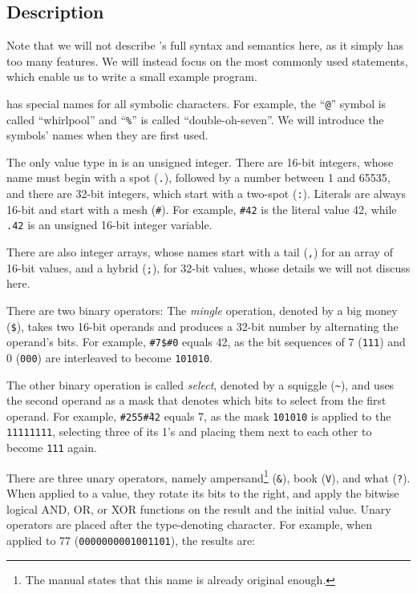 \subsection{Description}

Note that we will not describe \ic{}'s full syntax and semantics here, as it simply has too many features. We will instead focus on the most commonly used statements, which enable us to write a small example program.

\ic{} has special names for all symbolic characters. For example, the “\texttt{@}” symbol is called “whirlpool” and “\texttt{\%}” is called “double-oh-seven”. We will introduce the symbols' names when they are first used.

The only value type in \ic{} is an unsigned integer. There are 16-bit integers, whose name must begin with a spot (\texttt{.}), followed by a number between 1 and 65535, and there are 32-bit integers, which start with a two-spot (\texttt{:}). Literals are always 16-bit and start with a mesh (\texttt{\#}). For example, \texttt{\#42} is the literal value 42, while \texttt{.42} is an unsigned 16-bit integer variable.

There are also integer arrays, whose names start with a tail (\texttt{,}) for an array of 16-bit values, and a hybrid (\texttt{;}), for 32-bit values, whose details we will not discuss here.

There are two binary operators: The \emph{mingle} operation, denoted by a big money (\texttt{\$}), takes two 16-bit operands and produces a 32-bit number by alternating the operand's bits. For example, \texttt{\#7\$\#0} equals 42, as the bit sequences of 7 (\texttt{111}) and 0 (\texttt{000}) are interleaved to become \texttt{101010}.

The other binary operation is called \emph{select}, denoted by a squiggle (\texttt{\~}), and uses the second operand as a mask that denotes which bits to select from the first operand. For example, \texttt{\#255\~\#42} equals 7, as the mask \texttt{101010} is applied to the \texttt{11111111}, selecting three of its 1's and placing them next to each other to become \texttt{111} again.

There are three unary operators, namely ampersand\footnote{The manual states that this name is already original enough.} (\texttt{\&}), book (\texttt{V}), and what (\texttt{?}). When applied to a value, they rotate its bits to the right, and apply the bitwise logical AND, OR, or XOR functions on the result and the initial value. Unary operators are placed after the type-denoting character. For example, when applied to 77 (\texttt{0000000001001101}), the results are:

